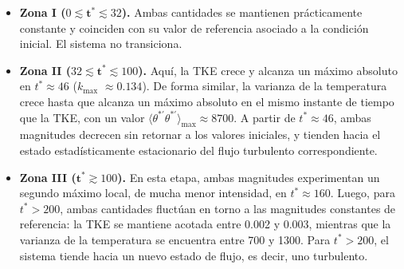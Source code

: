 \begin{itemize}

  \item \textbf{Zona I ($0 \lesssim \mathbf{t^*} \lesssim 32$).} Ambas cantidades se mantienen prácticamente constante y coinciden con su valor de referencia asociado a la condición inicial. El sistema no transiciona.

  \item \textbf{Zona II ($32 \lesssim \mathbf{t^*} \lesssim 100$).} Aquí, la TKE crece y alcanza un máximo absoluto en $t^* \approx 46$ ($k_{\text{max}}$ $\approx 0\text{.}134$). De forma similar, la varianza de la temperatura crece hasta que alcanza un máximo absoluto en el mismo instante de tiempo que la TKE, con un valor $\langle \theta^{*\prime} \theta^{*\prime}\rangle_{\text{max}} \approx 8700$. A partir de $t^* \approx 46$, ambas magnitudes decrecen sin retornar a los valores iniciales, y tienden hacia el estado estadísticamente estacionario del flujo turbulento correspondiente.


  \item \textbf{Zona III ($\mathbf{t^*} \gtrsim 100$).} En esta etapa, ambas magnitudes experimentan un segundo máximo local, de mucha menor intensidad, en $t^* \approx 160$. Luego, para $t^* > 200$, ambas cantidades fluctúan en torno a las magnitudes constantes de referencia: la TKE se mantiene acotada entre 0.002 y 0.003, mientras que la varianza de la temperatura se encuentra entre 700 y 1300. Para $t^* >200$, el sistema tiende hacia un nuevo estado de flujo, es decir, uno turbulento. 

\end{itemize}



